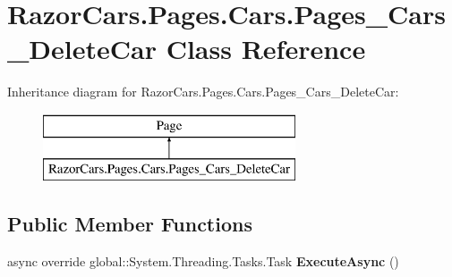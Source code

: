 \hypertarget{class_razor_cars_1_1_pages_1_1_cars_1_1_pages___cars___delete_car}{}\section{Razor\+Cars.\+Pages.\+Cars.\+Pages\+\_\+\+Cars\+\_\+\+Delete\+Car Class Reference}
\label{class_razor_cars_1_1_pages_1_1_cars_1_1_pages___cars___delete_car}
Inheritance diagram for Razor\+Cars.\+Pages.\+Cars.\+Pages\+\_\+\+Cars\+\_\+\+Delete\+Car\+:\begin{figure}[H]
\begin{center}
\leavevmode
\includegraphics[height=2.000000cm]{class_razor_cars_1_1_pages_1_1_cars_1_1_pages___cars___delete_car}
\end{center}
\end{figure}
\subsection*{Public Member Functions}
\begin{DoxyCompactItemize}
\item 
\mbox{\label{class_razor_cars_1_1_pages_1_1_cars_1_1_pages___cars___delete_car_a42cb07fbf23eda3ce0506aac4b8f2e00}} 
async override global\+::\+System.\+Threading.\+Tasks.\+Task {\bfseries Execute\+Async} ()
\end{DoxyCompactItemize}
